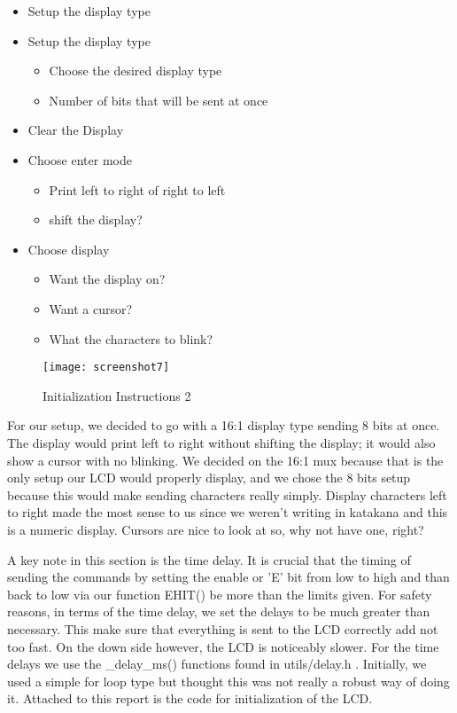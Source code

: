 \begin{itemize}
\item Setup the display type
\item Setup the display type\begin{itemize}
\item Choose the desired display type
\item Number of bits that will be sent at once
\end{itemize}
\item Clear the Display
\item Choose enter mode \begin{itemize}
\item Print left to right of right to left
\item shift the display?
\end{itemize}
\item Choose display \begin{itemize}
\item Want the display on?
\item Want a cursor?
\item What the characters to blink?
\end{itemize}
\end{itemize}

\begin{figure}[h]
\centering
\texttt{[image: screenshot7]}
\caption{Initialization Instructions 2}
\label{SECTION:fig:funcset}
\end{figure}

For our setup, we decided to go with a 16:1 display type sending 8 bits at once. The display would print left to right without shifting the display; it would also show a cursor with no blinking. We decided on the 16:1 mux because that is the only setup our LCD would properly display, and we chose the 8 bits setup because this would make sending characters really simply. Display characters left to right made the most sense to us since we weren't writing in katakana and this is a numeric display. Cursors are nice to look at so, why not have one, right? 

A key note in this section is the time delay. It is crucial that the timing of sending the commands by setting the enable or 'E' bit from low to high and than back to low via our function EHIT() be more than the limits given. For safety reasons, in terms of the time delay, we set the delays to be much greater than necessary. This make sure that everything is sent to the LCD correctly add not too fast. On the down side however, the LCD is noticeably slower. For the time delays we use the \_delay\_ms() functions found in utils/delay.h . Initially, we used a simple for loop type but thought this was not really a robust way of doing it.  Attached to this report is the code for initialization of the LCD.

